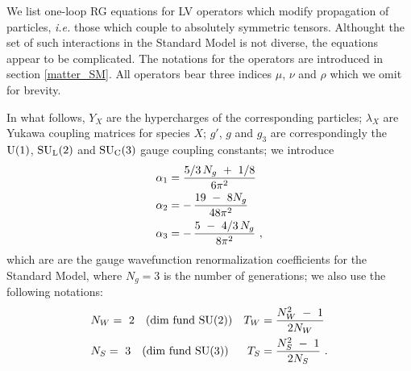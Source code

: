 \documentclass[12pt,preprintnumbers,nofootinbib]{revtex4}
\newcommand{\suc}{{{\rm SU}_{\rm C}(3)}}
\newcommand{\sul}{{{\rm SU}_{\rm L}(2)}}
\newcommand{\ue}{{{\rm U}(1)}}
\begin{document}
	

	We list one-loop RG equations for LV operators which modify propagation of
	particles, {\it i.e.} those which couple to absolutely symmetric tensors.
	Althought the set of such interactions in the Standard Model is not
	diverse, the equations appear to be complicated.
	The notations for the operators are introduced in section 
	\ref{matter_SM}.
	All operators bear three indices $ \mu $, $ \nu $ and $ \rho $ which we
	omit for brevity.

	In what follows, 
	$ Y_X $  are the hypercharges of the corresponding particles;
	$ \lambda_X $ are Yukawa coupling matrices for species  $ X $;
	$ g' $, $ g $ and $ g_3 $ are correspondingly the $ \ue $, $ \sul $ and $ \suc $ gauge
	coupling constants; 
	we introduce 
%
\begin{align}
\notag
	\alpha_1 & =        
			    \frac{5/3\, N_g ~+~ 1/8}
                                        {6\pi^2}  \\
\notag
	\alpha_2 & =    -\, \frac{19 ~-~ 8 N_g}
		                  {48\pi^2}  \\
\notag
	\alpha_3 & =    -\, \frac{5 ~-~4/3\, N_g}
			         {8\pi^2}~,
\end{align}
	which are
	are the gauge wavefunction renormalization coefficients for the Standard 
	Model, where $ N_g = 3 $ is the number of generations;
	we also use the following notations:
\begin{align}
\notag
	& N_W = ~2 \quad\text{(dim fund SU(2))} &
		T_W & = \frac{N_W^2 ~-~ 1}
			       {2 N_W}       
	\\
\notag
	& N_S = ~3 \quad\text{(dim fund SU(3))} &
		T_S & = \frac{N_S^2 ~-~ 1}
			       {2 N_S}
	~.
\end{align}
\end{document}
